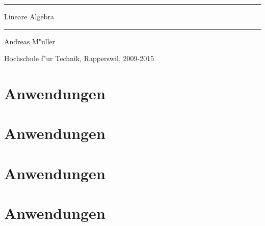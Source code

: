 \documentclass[a4paper,12pt]{book}
\begin{document}
\pagestyle{fancy}
\frontmatter
\newcommand\HRule{\noindent\rule{\linewidth}{1.5pt}}
\begin{titlepage}
\HRule
\vspace*{10pt}
\begin{flushright}
{\Huge
Lineare Algebra}
\end{flushright}
\HRule
\begin{flushright}
\vspace{30pt}
\LARGE
Andreas M"uller
\end{flushright}
\begin{center}
Hochschule f"ur Technik, Rapperswil, 2009-2015
\end{center}
\end{titlepage}
\hypersetup{
    linktoc=all,
    linkcolor=blue
}
\tableofcontents
\newtheorem{satz}{Satz}[chapter]
\newtheorem{hilfssatz}[satz]{Hilfssatz}
\newtheorem{definition}[satz]{Definition}
\newtheorem{annahme}[satz]{Annahme}
\newtheorem{aufgabe}[satz]{Aufgabe}
\newenvironment{beispiel}[1][Beispiel]{%
\begin{proof}[\bf #1]%
\renewcommand{\qedsymbol}{$\bigcirc$}%
}{\end{proof}}
\mainmatter



\section{Anwendungen}



\section{Anwendungen}


%

\section{Anwendungen}







%
%
%
%

\section{Anwendungen}


\appendix
\end{document}
